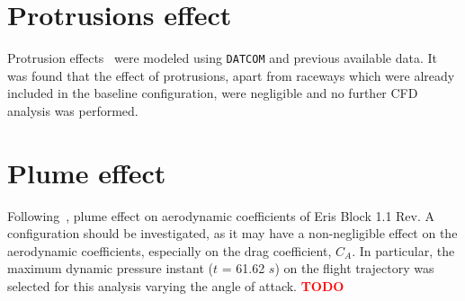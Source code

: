 \documentclass[12pt]{article}
\begin{document}
\section{Protrusions effect}\label{sec:protrusions}
Protrusion effects~\cite{roncioni2017preliminary,roncioni2019aerodatabase} were modeled using \texttt{DATCOM} and previous available data. It was found that the effect of protrusions, apart from raceways which were already included in the baseline configuration, were negligible and no further CFD analysis was performed.

\section{Plume effect}\label{sec:plume}
Following~\cite{brauckmann2011rocket,compton1975effects,pindzola1963jet,mehta2016skylon,gusman2011best,forbes2020trajectory}, plume effect on aerodynamic coefficients of Eris Block 1.1 Rev. A configuration should be investigated, as it may have a non-negligible effect on the aerodynamic coefficients, especially on the drag coefficient, $C_A$. In particular, the maximum dynamic pressure instant ($t$ = 61.62 $s$) on the flight trajectory was selected for this analysis varying the angle of attack. \textbf{\textcolor{red}{TODO}}
\end{document}
